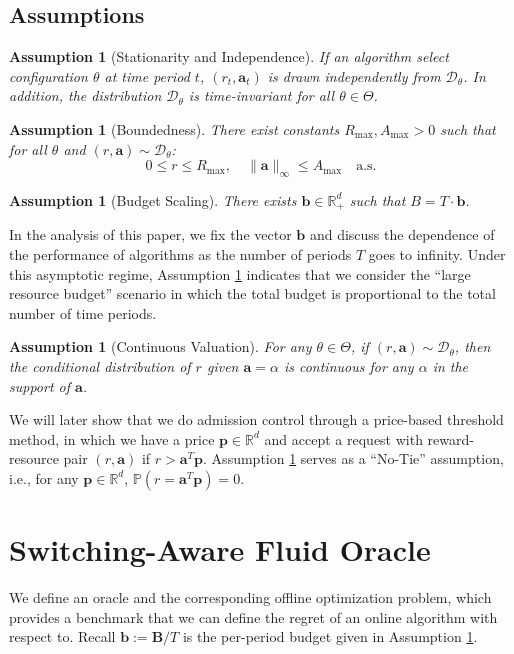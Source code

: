 \documentclass[11pt]{article}
\newtheorem{assumption}[theorem]{Assumption}
\newcommand{\bB}{\mathbf{B}}
\newcommand{\bb}{\mathbf{b}}
\newcommand{\ba}{\mathbf{a}}
\newcommand{\bp}{\mathbf{p}}
\newcommand{\cD}{\mathcal{D}}
\begin{document}
\subsection{Assumptions}
\begin{assumption}[Stationarity and Independence]
\label{assump:iid}
If an algorithm select configuration $\theta$ at time period $t$, $(r_t,\ba_t)$ is drawn independently from $\cD_\theta$. In addition, the distribution $\cD_\theta$ is time-invariant for all $\theta\in\Theta$.
\end{assumption}
\begin{assumption}[Boundedness]
\label{assump:bounded}
There exist constants $R_{\max}, A_{\max} > 0$ such that for all $\theta$ and $(r, \ba) \sim \cD_\theta$:
\[
0 \le r \le R_{\max}, \quad \|\ba\|_\infty \le A_{\max} \quad \text{a.s.}
\]
\end{assumption}

\begin{assumption}[Budget Scaling]
\label{assump:budget-scaling}
There exists $\bb\in \mathbb{R}_+^d$ such that $B=T\cdot \bb$.
\end{assumption}
In the analysis of this paper, we fix the vector $\bb$ and discuss the dependence of the performance of algorithms as the number of periods $T$ goes to infinity. Under this asymptotic regime, Assumption \ref{assump:budget-scaling} indicates that we consider the ``large resource budget'' scenario in which the total budget is proportional to the total number of time periods.
\begin{assumption}[Continuous Valuation]
\label{assump:contivalue}
For any $\theta\in\Theta$, if $(r,\ba)\sim \cD_{\theta}$, then the conditional distribution of $r$ given $\ba=\alpha$ is continuous for any $\alpha$ in the support of $\ba$.
\end{assumption}
We will later show that we do admission control through a price-based threshold method, in which we have a price $\bp\in\mathbb{R}^d$ and accept a request with reward-resource pair $(r,\ba)$ if $r>\ba^T\bp$. Assumption \ref{assump:contivalue} serves as a ``No-Tie'' assumption, i.e., for any $\bp\in \mathbb{R}^d$, $\mathbb{P}(r=\ba^T\bp)=0$.
\section{Switching-Aware Fluid Oracle}
\label{sec:oracle}
We define an oracle and the corresponding offline optimization problem, which provides a benchmark that we can define the regret of an online algorithm with respect to. Recall $\bb := \bB/T$ is the per-period budget given in Assumption \ref{assump:budget-scaling}.
\end{document}
